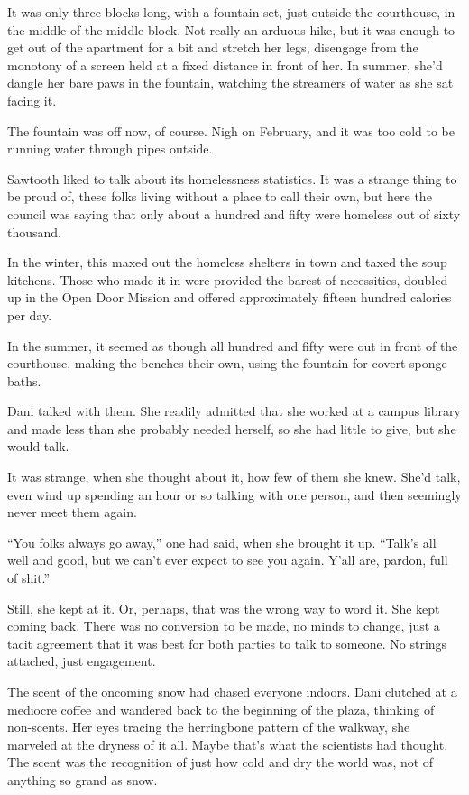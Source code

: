 It was only three blocks long, with a fountain set, just outside the courthouse, in the middle of the middle block. Not really an arduous hike, but it was enough to get out of the apartment for a bit and stretch her legs, disengage from the monotony of a screen held at a fixed distance in front of her. In summer, she'd dangle her bare paws in the fountain, watching the streamers of water as she sat facing it.

The fountain was off now, of course. Nigh on February, and it was too cold to be running water through pipes outside.

Sawtooth liked to talk about its homelessness statistics. It was a strange thing to be proud of, these folks living without a place to call their own, but here the council was saying that only about a hundred and fifty were homeless out of sixty thousand.

In the winter, this maxed out the homeless shelters in town and taxed the soup kitchens. Those who made it in were provided the barest of necessities, doubled up in the Open Door Mission and offered approximately fifteen hundred calories per day.

In the summer, it seemed as though all hundred and fifty were out in front of the courthouse, making the benches their own, using the fountain for covert sponge baths.

Dani talked with them. She readily admitted that she worked at a campus library and made less than she probably needed herself, so she had little to give, but she would talk.

It was strange, when she thought about it, how few of them she knew. She'd talk, even wind up spending an hour or so talking with one person, and then seemingly never meet them again.

``You folks always go away,'' one had said, when she brought it up. ``Talk's all well and good, but we can't ever expect to see you again. Y'all are, pardon, full of shit.''

Still, she kept at it. Or, perhaps, that was the wrong way to word it. She kept coming back. There was no conversion to be made, no minds to change, just a tacit agreement that it was best for both parties to talk to someone. No strings attached, just engagement.

The scent of the oncoming snow had chased everyone indoors. Dani clutched at a mediocre coffee and wandered back to the beginning of the plaza, thinking of non-scents. Her eyes tracing the herringbone pattern of the walkway, she marveled at the dryness of it all. Maybe that's what the scientists had thought. The scent was the recognition of just how cold and dry the world was, not of anything so grand as snow.


